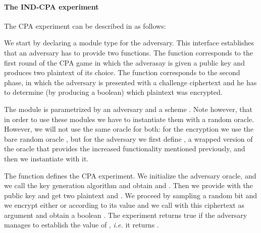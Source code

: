 \paragraph{The \textsf{IND-CPA} experiment}
The CPA experiment can be described in \EC as follows:

We start by declaring a module type for the adversary. This interface
establishes that an adversary has to provide two functions. The
function  corresponds to the first round of the CPA game in
which the adverasay is given a public key  and produces two
plaintext of its choice. The function  corresponds to the
second phase, in which the adversary is presented with a challenge
ciphertext  and he has to determine (by producing a boolean)
which plaintext was encrypted.

The module  is parametrized by an adversary  and a
scheme . Note however, that in order to use these modules we
have to instantiate them with a random oracle. However, we will not
use the same oracle for both: for the encryption we use the bare
random oracle , but for the adversary we first define ,
a wrapped version of the oracle that provides the increased
functionality mentioned previously, and then we instantiate 
with it.

The function  defines the CPA experiment. We initialize the
adversary oracle, and we call the key generation algorithm and obtain
 and . Then we provide  with the public key and get
two plaintext  and . We proceed by sampling a random bit
and we encrypt either  or  according to its value and we
call  with this ciphertext as argument and obtain a boolean
. The experiment returns true if the adversary manages to
establish the value of , {\em i.e.} it returns .

